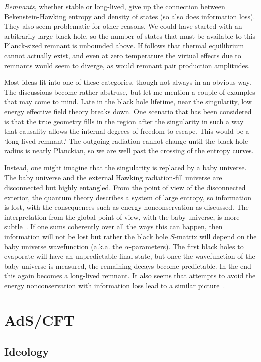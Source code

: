 \documentclass[12pt]{article}
\newcommand{\sect}[1]{\section{#1}\setcounter{equation}{0}}
\begin{document}
{\it Remnants}, whether stable or long-lived, give up the connection between Bekenstein-Hawking entropy and density of states (so also does information loss).  They also seem  problematic for other reasons.  We could have started with an arbitrarily large black hole, so the number of states that must be available to this Planck-sized remnant is unbounded above.  If follows that thermal equilibrium cannot actually exist, and even at zero temperature the virtual effects due to remnants would seem to diverge, as would remnant pair production amplitudes.
 
Most ideas fit into one of these categories, though not always in an obvious way.  The discussions become rather abstruse, but let me mention a couple of examples that may come to mind.   Late in the black hole lifetime, near the singularity, low energy effective field theory breaks down.  One scenario that has been considered is that the true geometry fills in the region after the singularity in such a way that causality allows the internal degrees of freedom to escape.  This would be a `long-lived remnant.'  The outgoing radiation cannot change until the black hole radius is nearly Planckian, so we are well past the crossing of the entropy curves.   

Instead, one might imagine that the singularity is replaced by a baby universe.  The baby universe and the external Hawking radiation-fill universe are disconnected but highly entangled.  From the point of view of the disconnected exterior, the quantum theory describes a system of large entropy, so information is lost, with the consequences such as energy nonconservation as discussed.  The interpretation from the global point of  view, with the baby universe, is  more subtle~\cite{Strominger:1994ey}.  If one sums coherently over all the ways this can happen, then information will not be lost but rather the black hole $S$-matrix will depend on the baby universe wavefunction (a.k.a. the $\alpha$-parameters).  The first black holes to evaporate will have an unpredictable final state, but once the wavefunction of the baby universe is measured, the remaining decays become predictable.  In the end this again becomes a long-lived remnant.  It also seems that attempts to avoid the energy nonconservation with information loss lead to a similar picture~\cite{Oppenheim:2009nb,Unruh:2012vd}.


\sect{AdS/CFT}

\subsection{Ideology}
\end{document}
